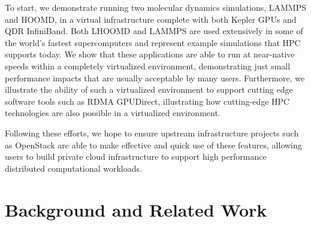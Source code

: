 \documentclass{sigplanconf}
\begin{document}
To start, we demonstrate running two molecular dynamics simulations, LAMMPS and HOOMD, in a virtual infrastructure complete with both Kepler GPUs and QDR InfiniBand.  Both LHOOMD and LAMMPS are used extensively in some of the world's fastest supercomputers and represent example simulations that HPC supports today.  We show that these applications are able to run at near-native speeds within a completely virtualized environment, demonstrating just small performance impacts that are usually acceptable by many users. Furthermore, we illustrate the ability of such a virtualized environment to support cutting edge software tools such as RDMA GPUDirect, illustrating how cutting-edge HPC technologies are also possible in a virtualized environment. 

Following these efforts, we hope to ensure upstream infrastructure projects such as OpenStack \cite{www-openstack, pepple2011deploying} are able to make effective and quick use of these features, allowing users to build private cloud infrastructure to support high performance distributed computational workloads. 





 


\section{Background and Related Work}

\end{document}
